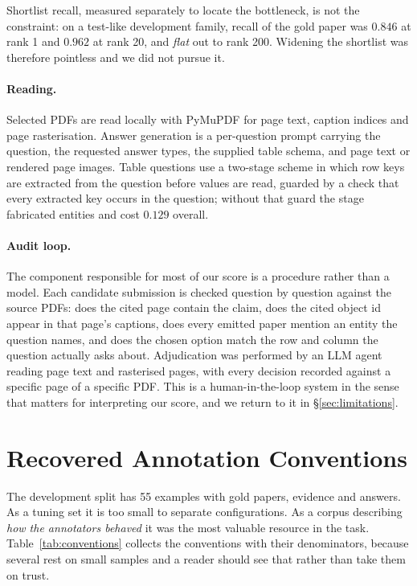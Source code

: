 \documentclass[11pt]{article}
\begin{document}
Shortlist recall, measured separately to locate the bottleneck, is not the
constraint: on a test-like development family, recall of the gold paper was
$0.846$ at rank 1 and $0.962$ at rank 20, and \emph{flat} out to rank 200.
Widening the shortlist was therefore pointless and we did not pursue it.

\paragraph{Reading.}
Selected PDFs are read locally with PyMuPDF for page text, caption indices and
page rasterisation. Answer generation is a per-question prompt carrying the
question, the requested answer types, the supplied table schema, and page text or
rendered page images. Table questions use a two-stage scheme in which row keys
are extracted from the question before values are read, guarded by a check that
every extracted key occurs in the question; without that guard the stage
fabricated entities and cost $0.129$ overall.

\paragraph{Audit loop.}
The component responsible for most of our score is a procedure rather than a
model. Each candidate submission is checked question by question against the
source PDFs: does the cited page contain the claim, does the cited object id
appear in that page's captions, does every emitted paper mention an entity the
question names, and does the chosen option match the row and column the question
actually asks about. Adjudication was performed by an LLM agent reading page text
and rasterised pages, with every decision recorded against a specific page of a
specific PDF. This is a human-in-the-loop system in the sense that matters for
interpreting our score, and we return to it in \S\ref{sec:limitations}.

\section{Recovered Annotation Conventions}
\label{sec:conventions}

The development split has 55 examples with gold papers, evidence and answers. As
a tuning set it is too small to separate configurations. As a
corpus describing \emph{how the annotators behaved} it was the most valuable
resource in the task. Table~\ref{tab:conventions} collects the conventions with
their denominators, because several rest on small samples and a reader should see
that rather than take them on trust.
\end{document}
